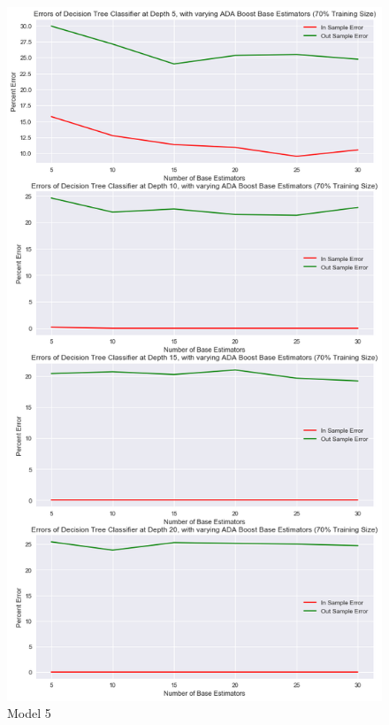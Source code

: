 \documentclass[10pt,twocolumn]{article}
\begin{document}
\begin{table}[ht]
\begin{figure}[!t]
  \begin{center}
    \includegraphics[width=\textwidth,height=\textheight,keepaspectratio]{ada_boost.png}
  \end{center}

  \caption{\small Model 5}
  \label{fig-1}
\end{figure}


\end{table}
\end{document}
